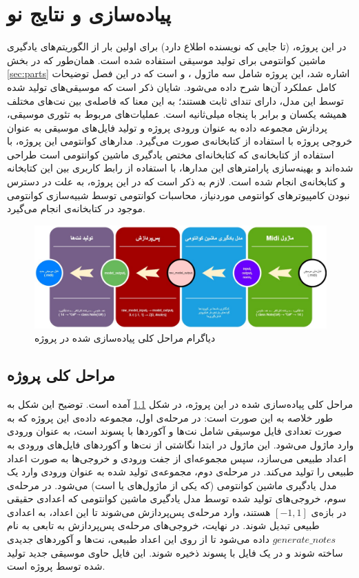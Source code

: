 \chapter{پیاده‌سازی و نتایج نو}

در این پروژه، (تا جایی که نویسنده اطلاع دارد) برای اولین بار از الگوریتم‌های یادگیری ماشین کوانتومی برای تولید موسیقی استفاده شده است. همان‌طور که در بخش
\ref{sec:parts}
اشاره شد، این پروژه شامل سه ماژول 
،
و
است که در این فصل توضیحات کامل عملکرد آن‌ها شرح داده می‌شود.
شایان ذکر است که موسیقی‌های تولید شده توسط این مدل، دارای تندای ثابت هستند؛ به این معنا که فاصله‌ی بین نت‌های مختلف همیشه یکسان و برابر با پنجاه میلی‌ثانیه است.
عملیات‌های مربوط به تئوری موسیقی، پردازش مجموعه داده به عنوان ورودی پروژه و تولید فایل‌های موسیقی به عنوان خروجی پروژه با استفاده از کتابخانه‌ی
صورت می‌گیرد.
مدارهای کوانتومی این پروژه، با استفاده از کتابخانه‌ی 
که کتابخانه‌ای مختص یادگیری ماشین کوانتومی است طراحی شده‌اند و بهینه‌سازی پارامترهای این مدارها، با استفاده از رابط کاربری بین این کتابخانه و کتابخانه‌ی
انجام شده است.
لازم به ذکر است که در این پروژه، به علت در دسترس نبودن کامپیوترهای کوانتومی موردنیاز، محاسبات کوانتومی توسط شبیه‌سازی کوانتومی موجود در کتابخانه‌ی
انجام می‌گیرد.

\begin{figure}
	\centering
	\includegraphics[scale=0.355]{figures/Diagram.jpg}
	\caption{دیاگرام مراحل کلی پیاده‌سازی شده در پروژه}
	\label{fig:diagram}
\end{figure}

\section{مراحل کلی پروژه}
مراحل کلی پیاده‌سازی شده در این پروژه، در شکل
\ref{fig:diagram}
آمده است.
توضیح این شکل به طور خلاصه به این صورت است: در مرحله‌ی اول، مجموعه داده‌ی این پروژه که به صورت تعدادی فایل موسیقی شامل نت‌ها و آکوردها با پسوند
است، به عنوان ورودی وارد ماژول
می‌شود. این ماژول در ابتدا نگاشتی از نت‌ها و آکوردهای فایل‌های ورودی به اعداد طبیعی می‌سازد، سپس مجموعه‌ای از جفت ورودی و خروجی‌ها به صورت اعداد طبیعی را تولید می‌کند. در مرحله‌ی دوم، مجموعه‌ی تولید شده به عنوان ورودی وارد یک مدل یادگیری ماشین کوانتومی (که یکی از ماژول‌های 
یا
است) می‌شود. در مرحله‌ی سوم، خروجی‌های تولید شده توسط مدل یادگیری ماشین کوانتومی که اعدادی حقیقی در بازه‌ی
$[-1, 1]$
هستند، وارد مرحله‌ی پس‌پردازش می‌شوند تا این اعداد، به اعدادی طبیعی تبدیل شوند.
در نهایت، خروجی‌های مرحله‌ی پس‌پردازش به تابعی به نام
$generate\_notes$
داده می‌شود تا از روی این اعداد طبیعی، نت‌ها و آکوردهای جدیدی ساخته شوند و در یک فایل با پسوند
ذخیره شوند. این فایل حاوی موسیقی جدید تولید شده توسط پروژه است.



